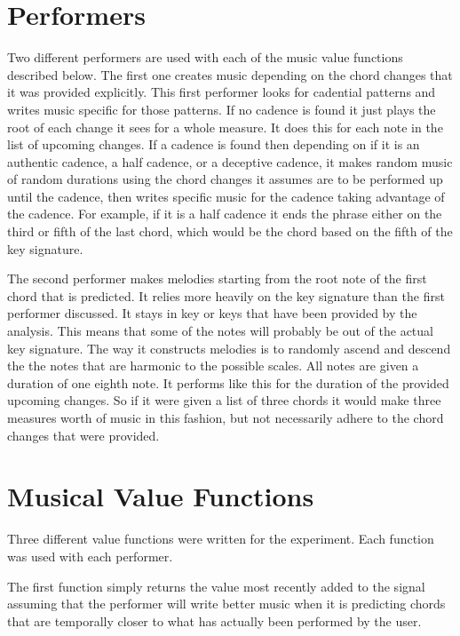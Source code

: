\documentclass[12pt]{ucthesis}
\begin{document}
\section{Performers}
\label {performers}

Two different performers are used with each of the music value functions described below. The first one creates music depending on the chord changes that it was provided explicitly. This first performer looks for cadential patterns and writes music specific for those patterns. If no cadence is found it just plays the root of each change it sees for a whole measure. It does this for each note in the list of upcoming changes. If a cadence is found then depending on if it is an authentic cadence, a half cadence, or a deceptive cadence, it makes random music of random durations using the chord changes it assumes are to be performed up until the cadence, then writes specific music for the cadence taking advantage of the cadence. For example, if it is a half cadence it ends the phrase either on the third or fifth of the last chord, which would be the chord based on the fifth of the key signature.

The second performer makes melodies starting from the root note of the first chord that is predicted. It relies more heavily on the key signature than the first performer discussed. It stays in key or keys that have been provided by the analysis. This means that some of the notes will probably be out of the actual key signature. The way it constructs melodies is to randomly ascend and descend the the notes that are harmonic to the possible scales. All notes are given a duration of one eighth note. It performs like this for the duration of the provided upcoming changes. So if it were given a list of three chords it would make three measures worth of music in this fashion, but not necessarily adhere to the chord changes that were provided.

\section{Musical Value Functions}
\label {musical-value-functions}
Three different value functions were written for the experiment. Each function was used with each performer. 

The first function simply returns the value most recently added to the signal assuming that the performer will write better music when it is predicting chords that are temporally closer to what has actually been performed by the user.  
\end{document}
